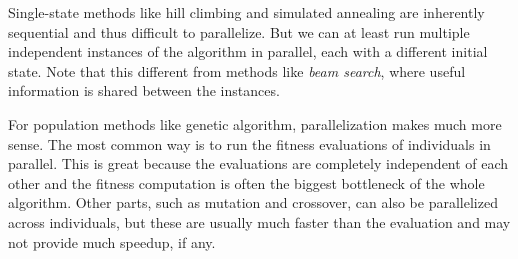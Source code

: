Single-state methods like hill climbing and simulated annealing are inherently sequential and thus difficult to parallelize. But we can at least run multiple independent instances of the algorithm in parallel, each with a different initial state. Note that this different from methods like \textit{beam search}, where useful information is shared between the instances.

For population methods like genetic algorithm, parallelization makes much more sense. The most common way is to run the fitness evaluations of individuals in parallel. This is great because the evaluations are completely independent of each other and the fitness computation is often the biggest bottleneck of the whole algorithm. Other parts, such as mutation and crossover, can also be parallelized across individuals, but these are usually much faster than the evaluation and may not provide much speedup, if any.

% 
% 
